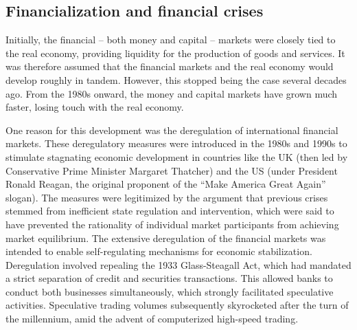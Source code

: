 \documentclass[
  a4paper,
  DIV=11,
  numbers=noendperiod,
  oneside,
  openany]{scrreprt}
\begin{document}
\subsection{Financialization and financial
crises}\label{financialization-and-financial-crises}

Initially, the financial -- both money and capital -- markets were
closely tied to the real economy, providing liquidity for the production
of goods and services. It was therefore assumed that the financial
markets and the real economy would develop roughly in tandem. However,
this stopped being the case several decades ago. From the 1980s onward,
the money and capital markets have grown much faster, losing touch with
the real economy.

One reason for this development was the deregulation of international
financial markets. These deregulatory measures were introduced in the
1980s and 1990s to stimulate stagnating economic development in
countries like the UK (then led by Conservative Prime Minister Margaret
Thatcher) and the US (under President Ronald Reagan, the original
proponent of the ``Make America Great Again'' slogan). The measures were
legitimized by the argument that previous crises stemmed from
inefficient state regulation and intervention, which were said to have
prevented the rationality of individual market participants from
achieving market equilibrium. The extensive deregulation of the
financial markets was intended to enable self-regulating mechanisms for
economic stabilization. Deregulation involved repealing the 1933
Glass-Steagall Act, which had mandated a strict separation of credit and
securities transactions. This allowed banks to conduct both businesses
simultaneously, which strongly facilitated speculative activities.
Speculative trading volumes subsequently skyrocketed after the turn of
the millennium, amid the advent of computerized high-speed trading.
\end{document}
